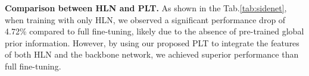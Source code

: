 \textbf{Comparison between HLN and PLT.} As shown in the Tab.\ref{tab:sidenet}, when training with only HLN, we observed a significant performance drop of 4.72\% compared to full fine-tuning, likely due to the absence of pre-trained global prior information. However, by using our proposed PLT to integrate the features of both HLN and the backbone network, we achieved superior performance than full fine-tuning.

